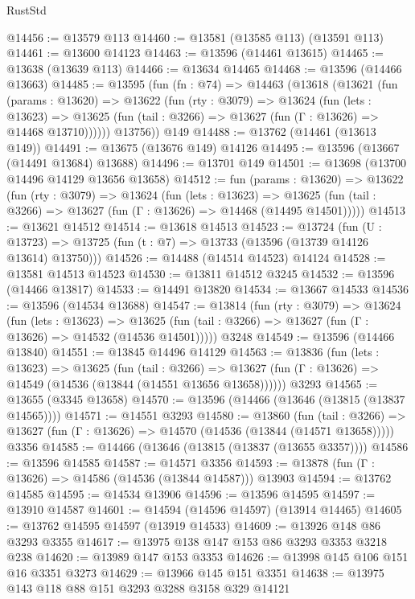 \begin{lexlean}{RustStd}
\begin{coremodule}
@14456 := @13579 @113
@14460 := @13581 (@13585 @113) (@13591 @113)
@14461 := @13600 @14123
@14463 := @13596 (@14461 @13615)
@14465 := @13638 (@13639 @113)
@14466 := @13634 @14465
@14468 := @13596 (@14466 @13663)
@14485 := @13595
    (fun (fn : @74) =>
    @14463
      (@13618
        (@13621
          (fun (params : @13620) =>
          @13622
            (fun (rty : @3079) =>
            @13624
              (fun (lets : @13623) =>
              @13625 (fun (tail : @3266) => @13627 (fun (Γ : @13626) => @14468 @13710))))))
        @13756))
    @149
@14488 := @13762 (@14461 (@13613 @149))
@14491 := @13675 (@13676 @149) @14126
@14495 := @13596 (@13667 (@14491 @13684) @13688)
@14496 := @13701 @149
@14501 := @13698 (@13700 @14496 @14129 @13656 @13658)
@14512 := fun (params : @13620) =>
  @13622
    (fun (rty : @3079) =>
    @13624
      (fun (lets : @13623) =>
      @13625 (fun (tail : @3266) => @13627 (fun (Γ : @13626) => @14468 (@14495 @14501)))))
@14513 := @13621 @14512
@14514 := @13618 @14513
@14523 := @13724
    (fun (U : @13723) => @13725 (fun (t : @7) => @13733 (@13596 (@13739 @14126 @13614) @13750)))
@14526 := @14488 (@14514 @14523) @14124
@14528 := @13581 @14513 @14523
@14530 := @13811 @14512 @3245
@14532 := @13596 (@14466 @13817)
@14533 := @14491 @13820
@14534 := @13667 @14533
@14536 := @13596 (@14534 @13688)
@14547 := @13814
    (fun (rty : @3079) =>
    @13624
      (fun (lets : @13623) =>
      @13625 (fun (tail : @3266) => @13627 (fun (Γ : @13626) => @14532 (@14536 @14501)))))
    @3248
@14549 := @13596 (@14466 @13840)
@14551 := @13845 @14496 @14129
@14563 := @13836
    (fun (lets : @13623) =>
    @13625
      (fun (tail : @3266) =>
      @13627 (fun (Γ : @13626) => @14549 (@14536 (@13844 (@14551 @13656 @13658))))))
    @3293
@14565 := @13655 (@3345 @13658)
@14570 := @13596 (@14466 (@13646 (@13815 (@13837 @14565))))
@14571 := @14551 @3293
@14580 := @13860
    (fun (tail : @3266) => @13627 (fun (Γ : @13626) => @14570 (@14536 (@13844 (@14571 @13658)))))
    @3356
@14585 := @14466 (@13646 (@13815 (@13837 (@13655 @3357))))
@14586 := @13596 @14585
@14587 := @14571 @3356
@14593 := @13878 (fun (Γ : @13626) => @14586 (@14536 (@13844 @14587))) @13903
@14594 := @13762 @14585
@14595 := @14534 @13906
@14596 := @13596 @14595
@14597 := @13910 @14587
@14601 := @14594 (@14596 @14597) (@13914 @14465)
@14605 := @13762 @14595 @14597 (@13919 @14533)
@14609 := @13926 @148 @86 @3293 @3355
@14617 := @13975 @138 @147 @153 @86 @3293 @3353 @3218 @238
@14620 := @13989 @147 @153 @3353
@14626 := @13998 @145 @106 @151 @16 @3351 @3273
@14629 := @13966 @145 @151 @3351
@14638 := @13975 @143 @118 @88 @151 @3293 @3288 @3158 @329 @14121

\end{coremodule}
\end{lexlean}
